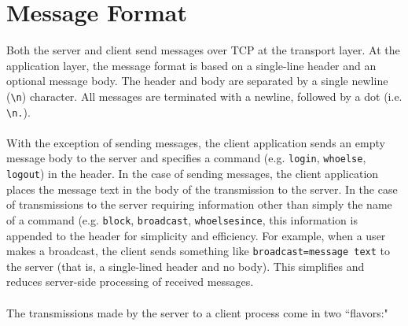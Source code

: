 \documentclass[12pt,a4paper]{article}
\begin{document}
\section{Message Format}
\label{sec:msg_format}

Both the server and client send messages over TCP at the transport layer. At the application layer, the message format is based on a single-line header and an optional message body. The header and body are separated by a single newline (\verb|\n|) character. All messages are terminated with a newline, followed by a dot (i.e. \verb|\n.|).
\\\\
With the exception of sending messages, the client application sends an empty message body to the server and specifies a command (e.g. \verb|login|, \verb|whoelse|, \verb|logout|) in the header. In the case of sending messages, the client application places the message text in the body of the transmission to the server. In the case of transmissions to the server requiring information other than simply the name of a command (e.g. \verb|block|, \verb|broadcast|, \verb|whoelsesince|, this information is appended to the header for simplicity and efficiency. For example, when a user makes a broadcast, the client sends something like \verb|broadcast=message text| to the server (that is, a single-lined header and no body). This simplifies and reduces server-side processing of received messages.
\\\\
The transmissions made by the server to a client process come in two ``flavors:"
\end{document}
